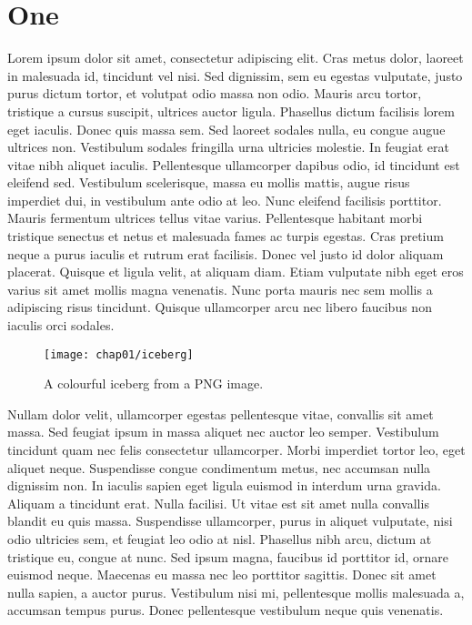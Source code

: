 \chapter{One}

Lorem ipsum dolor sit amet, consectetur adipiscing elit. Cras metus
dolor, laoreet in malesuada id, tincidunt vel nisi. Sed dignissim, sem
eu egestas vulputate, justo purus dictum tortor, et volutpat odio
massa non odio. Mauris arcu tortor, tristique a cursus suscipit,
ultrices auctor ligula. Phasellus dictum facilisis lorem eget
iaculis. Donec quis massa sem. Sed laoreet sodales nulla, eu congue
augue ultrices non. Vestibulum sodales fringilla urna ultricies
molestie. In feugiat erat vitae nibh aliquet iaculis. Pellentesque
ullamcorper dapibus odio, id tincidunt est eleifend sed. Vestibulum
scelerisque, massa eu mollis mattis, augue risus imperdiet dui, in
vestibulum ante odio at leo. Nunc eleifend facilisis porttitor. Mauris
fermentum ultrices tellus vitae varius. Pellentesque habitant morbi
tristique senectus et netus et malesuada fames ac turpis egestas. Cras
pretium neque a purus iaculis et rutrum erat facilisis. Donec vel
justo id dolor aliquam placerat. Quisque et ligula velit, at aliquam
diam. Etiam vulputate nibh eget eros varius sit amet mollis magna
venenatis. Nunc porta mauris nec sem mollis a adipiscing risus
tincidunt. Quisque ullamcorper arcu nec libero faucibus non iaculis
orci sodales.

\begin{figure}[hbt]
  \centering
  \texttt{[image: chap01/iceberg]}
  \caption{A colourful iceberg from a PNG image.}
  \label{fig:iceberg}
\end{figure}

Nullam dolor velit, ullamcorper egestas pellentesque vitae, convallis
sit amet massa. Sed feugiat ipsum in massa aliquet nec auctor leo
semper. Vestibulum tincidunt quam nec felis consectetur
ullamcorper. Morbi imperdiet tortor leo, eget aliquet
neque. Suspendisse congue condimentum metus, nec accumsan nulla
dignissim non. In iaculis sapien eget ligula euismod in interdum urna
gravida. Aliquam a tincidunt erat. Nulla facilisi. Ut vitae est sit
amet nulla convallis blandit eu quis massa. Suspendisse ullamcorper,
purus in aliquet vulputate, nisi odio ultricies sem, et feugiat leo
odio at nisl. Phasellus nibh arcu, dictum at tristique eu, congue at
nunc. Sed ipsum magna, faucibus id porttitor id, ornare euismod
neque. Maecenas eu massa nec leo porttitor sagittis. Donec sit amet
nulla sapien, a auctor purus. Vestibulum nisi mi, pellentesque mollis
malesuada a, accumsan tempus purus. Donec pellentesque vestibulum
neque quis venenatis.
